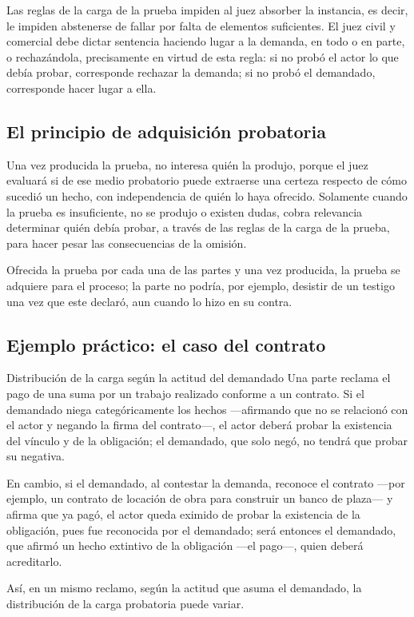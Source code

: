 \documentclass[12pt,oneside]{book}
\begin{document}
Las reglas de la carga de la prueba impiden al juez absorber la instancia, es decir, le impiden abstenerse de fallar por falta de elementos suficientes. El juez civil y comercial debe dictar sentencia haciendo lugar a la demanda, en todo o en parte, o rechazándola, precisamente en virtud de esta regla: si no probó el actor lo que debía probar, corresponde rechazar la demanda; si no probó el demandado, corresponde hacer lugar a ella.

\subsection{El principio de adquisición probatoria}

Una vez producida la prueba, no interesa quién la produjo, porque el juez evaluará si de ese medio probatorio puede extraerse una certeza respecto de cómo sucedió un hecho, con independencia de quién lo haya ofrecido. Solamente cuando la prueba es insuficiente, no se produjo o existen dudas, cobra relevancia determinar quién debía probar, a través de las reglas de la carga de la prueba, para hacer pesar las consecuencias de la omisión.

\begin{note}
Ofrecida la prueba por cada una de las partes y una vez producida, la prueba se adquiere para el proceso; la parte no podría, por ejemplo, desistir de un testigo una vez que este declaró, aun cuando lo hizo en su contra.
\end{note}

\subsection{Ejemplo práctico: el caso del contrato}

\begin{example}{Distribución de la carga según la actitud del demandado}
Una parte reclama el pago de una suma por un trabajo realizado conforme a un contrato. Si el demandado niega categóricamente los hechos —afirmando que no se relacionó con el actor y negando la firma del contrato—, el actor deberá probar la existencia del vínculo y de la obligación; el demandado, que solo negó, no tendrá que probar su negativa.

En cambio, si el demandado, al contestar la demanda, reconoce el contrato —por ejemplo, un contrato de locación de obra para construir un banco de plaza— y afirma que ya pagó, el actor queda eximido de probar la existencia de la obligación, pues fue reconocida por el demandado; será entonces el demandado, que afirmó un hecho extintivo de la obligación —el pago—, quien deberá acreditarlo.

Así, en un mismo reclamo, según la actitud que asuma el demandado, la distribución de la carga probatoria puede variar.
\end{example}
\end{document}
